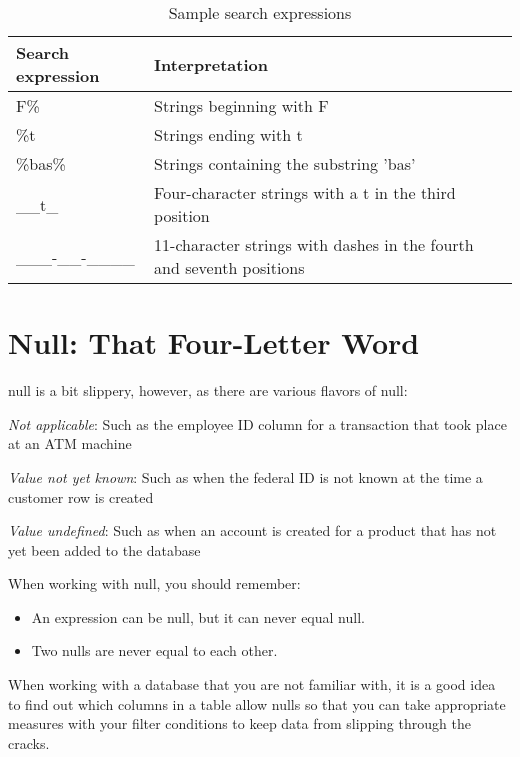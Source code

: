 \begin{table}
    \centering
    \caption{Sample search expressions}
    \begin{tabular}{ll}
        \hline
        Search expression    & Interpretation                                                       \\
        \hline
        F\%                  & Strings beginning with F                                             \\
        \%t                  & Strings ending with t                                                \\
        \%bas\%              & Strings containing the substring 'bas'                               \\
        \_\_t\_              & Four-character strings with a t in the third position                \\
        \_\_\_-\_\_-\_\_\_\_ & 11-character strings with dashes in the fourth and seventh positions \\
        \hline
    \end{tabular}
\end{table}
\section{Null: That Four-Letter Word}
null is a bit slippery, however, as there are various flavors of null:

\textit{Not applicable}: Such as the employee ID column for a transaction that took place at an ATM machine

\textit{Value not yet known}: Such as when the federal ID is not known at the time a customer row is created

\textit{Value undefined}: Such as when an account is created for a product that has not yet been added to the database

When working with null, you should remember:
\begin{itemize}
    \item An expression can be null, but it can never equal null.
    \item Two nulls are never equal to each other.
\end{itemize}

When working with a database that you are not familiar with, it is a good idea to find out which columns in a table allow nulls so that you can take appropriate measures with your filter conditions to keep data from slipping through the cracks.